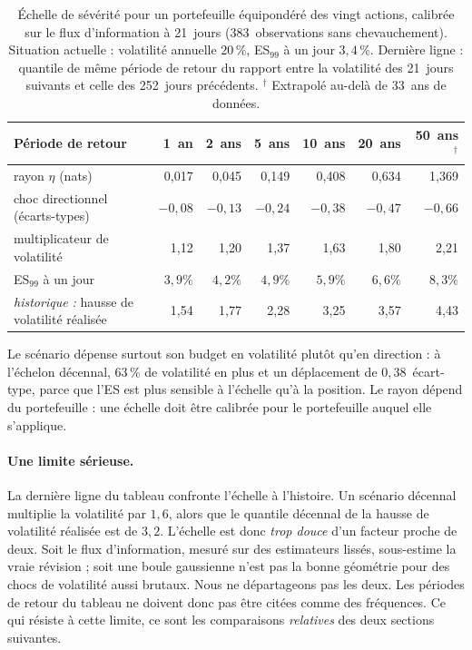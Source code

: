 \documentclass[11pt]{article}
\theoremstyle{definition}
\begin{document}
\begin{table}[htbp]
\centering
\small
\begin{tabular}{@{}lrrrrrr@{}}
\toprule
Période de retour & 1~an & 2~ans & 5~ans & 10~ans & 20~ans & 50~ans$^\dagger$ \\
\midrule
rayon $\eta$ (nats) & 0,017 & 0,045 & 0,149 & 0,408 & 0,634 & 1,369 \\
choc directionnel (écarts-types) & $-0{,}08$ & $-0{,}13$ & $-0{,}24$ & $-0{,}38$ & $-0{,}47$ & $-0{,}66$ \\
multiplicateur de volatilité & 1,12 & 1,20 & 1,37 & 1,63 & 1,80 & 2,21 \\
ES$_{99}$ à un jour & $3{,}9\%$ & $4{,}2\%$ & $4{,}9\%$ & $5{,}9\%$ & $6{,}6\%$ & $8{,}3\%$ \\
\midrule
\emph{historique :} hausse de volatilité réalisée & 1,54 & 1,77 & 2,28 & 3,25 & 3,57 & 4,43 \\
\bottomrule
\end{tabular}
\caption{Échelle de sévérité pour un portefeuille équipondéré des vingt
actions, calibrée sur le flux d'information à 21~jours (383~observations sans
chevauchement). Situation actuelle : volatilité annuelle $20\,\%$, ES$_{99}$
à un jour $3{,}4\,\%$. Dernière ligne : quantile de même période de retour du
rapport entre la volatilité des 21~jours suivants et celle des 252~jours
précédents. $^\dagger$ Extrapolé au-delà de 33~ans de données.}
\label{tab:ladder}
\end{table}

Le scénario dépense surtout son budget en volatilité plutôt qu'en direction : à
l'échelon décennal, $63\,\%$ de volatilité en plus et un déplacement de
$0{,}38$~écart-type, parce que l'ES est plus sensible à l'échelle qu'à la
position. Le rayon dépend du portefeuille : une échelle doit être calibrée pour
le portefeuille auquel elle s'applique.

\paragraph{Une limite sérieuse.} La dernière ligne du tableau confronte
l'échelle à l'histoire. Un scénario décennal multiplie la volatilité par
$1{,}6$, alors que le quantile décennal de la hausse de volatilité réalisée est
de $3{,}2$. L'échelle est donc \emph{trop douce} d'un facteur proche de deux.
Soit le flux d'information, mesuré sur des estimateurs lissés, sous-estime la
vraie révision ; soit une boule gaussienne n'est pas la bonne géométrie pour
des chocs de volatilité aussi brutaux. Nous ne départageons pas les deux. Les
périodes de retour du tableau ne doivent donc pas être citées comme des
fréquences. Ce qui résiste à cette limite, ce sont les comparaisons
\emph{relatives} des deux sections suivantes.
\end{document}

